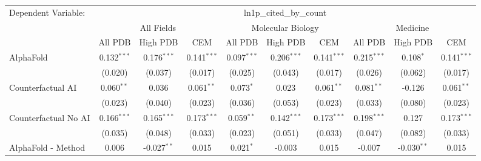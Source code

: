 \begingroup
\centering
\begin{tabular}{lccccccccc}
   \tabularnewline \midrule \midrule
   Dependent Variable: & \multicolumn{9}{c}{ln1p\_cited\_by\_count}\\
 & \multicolumn{3}{c}{All Fields} & \multicolumn{3}{c}{Molecular Biology} & \multicolumn{3}{c}{Medicine} \\
\cmidrule(lr){2-7} \cmidrule(lr){5-10} \cmidrule(lr){8-7}
 & \multicolumn{1}{c}{All PDB} & \multicolumn{1}{c}{High PDB} & \multicolumn{1}{c}{CEM} & \multicolumn{1}{c}{All PDB} & \multicolumn{1}{c}{High PDB} & \multicolumn{1}{c}{CEM} & \multicolumn{1}{c}{All PDB} & \multicolumn{1}{c}{High PDB} & \multicolumn{1}{c}{CEM} \\
\cmidrule(lr){2-3} \cmidrule(lr){3-4} \cmidrule(lr){4-5} \cmidrule(lr){5-6} \cmidrule(lr){6-7} \cmidrule(lr){7-8} \cmidrule(lr){8-9} \cmidrule(lr){9-10} \cmidrule(lr){10-3}
   AlphaFold                                                   & 0.132$^{***}$ & 0.176$^{***}$ & 0.141$^{***}$ & 0.097$^{***}$ & 0.206$^{***}$  & 0.141$^{***}$ & 0.215$^{***}$ & 0.108$^{*}$   & 0.141$^{***}$\\   
                                                               & (0.020)       & (0.037)       & (0.017)       & (0.025)       & (0.043)        & (0.017)       & (0.026)       & (0.062)       & (0.017)\\   
   Counterfactual AI                                           & 0.060$^{**}$  & 0.036         & 0.061$^{**}$  & 0.073$^{*}$   & 0.023          & 0.061$^{**}$  & 0.081$^{**}$  & -0.126        & 0.061$^{**}$\\   
                                                               & (0.023)       & (0.040)       & (0.023)       & (0.036)       & (0.053)        & (0.023)       & (0.033)       & (0.080)       & (0.023)\\   
   Counterfactual No AI                                        & 0.166$^{***}$ & 0.165$^{***}$ & 0.173$^{***}$ & 0.059$^{**}$  & 0.142$^{***}$  & 0.173$^{***}$ & 0.198$^{***}$ & 0.127         & 0.173$^{***}$\\   
                                                               & (0.035)       & (0.048)       & (0.033)       & (0.023)       & (0.051)        & (0.033)       & (0.047)       & (0.082)       & (0.033)\\   
   AlphaFold - Method                                          & 0.006         & -0.027$^{**}$ & 0.015         & 0.021$^{*}$   & -0.003         & 0.015         & -0.007        & -0.030$^{**}$ & 0.015\\   

\end{tabular}
